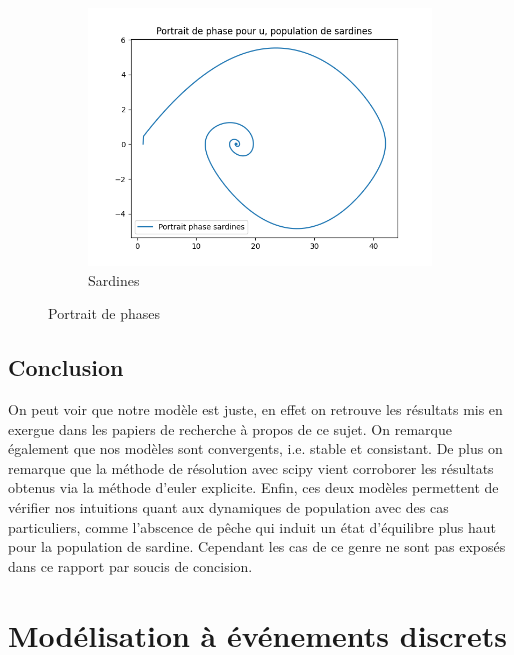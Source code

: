 \documentclass[a4paper, 11pt]{report}%
\begin{document}
\begin{figure}[!h]
\begin{subfigure}[b]{.3\textwidth}
        		\centering
       			\includegraphics[width=\textwidth]{figures/Portrait_de_phase_sardine.png}
            	\caption{Sardines}
    		\end{subfigure}
    		\caption{Portrait de phases}
		\end{figure}


        \subsection{Conclusion}
        On peut voir que notre modèle est juste, en effet on retrouve les résultats mis en exergue 
        dans les papiers de recherche à propos de ce sujet. On remarque également que nos modèles
        sont convergents, i.e. stable et consistant. De plus on remarque que la méthode de résolution avec
        scipy vient corroborer les résultats obtenus via la méthode d'euler explicite. Enfin, ces deux modèles
        permettent de vérifier nos intuitions quant aux dynamiques de population avec des cas particuliers,
        comme l'abscence de pêche qui induit un état d'équilibre plus haut pour la population de sardine. 
        Cependant les cas de ce genre ne sont pas exposés dans ce rapport par soucis de concision. 

    \section{Modélisation à événements discrets}
\end{document}
